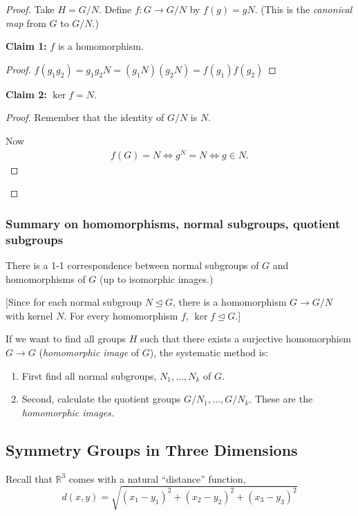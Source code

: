 \documentclass{article}
\theoremstyle{definition} \newtheorem*{definition}{Definition}
\newcommand{\reals}{\mathbb{R}} \newcommand{\rationals}{\mathbb{Q}}
\begin{document}
  \begin{proof} Take $H=G/N$. Define $f:G \rightarrow G/N$ by $f(g)=gN$. (This
    is the \textit{canonical map} from $G$ to $G/N$.)

    \textbf{Claim 1:} $f$ is a homomorphism.

    \begin{proof} $f(g_1g_2)=g_1g_2N=(g_1N)(g_2N)=f(g_1)f(g_2)$ \end{proof}

    \textbf{Claim 2:} $\ker f = N$.  \begin{proof} Remember that the identity of
      $G/N$ is $N$.
      
      Now 
      \begin{align*}
      f(G)=N \iff  g^N = N \iff g \in N. 
      \end{align*}
    \end{proof}
  \end{proof}

  \subsubsection*{Summary on homomorphisms, normal subgroups, quotient
  subgroups} There is a 1-1 correspondence between normal subgroups of $G$ and
  homomorphisms of $G$ (up to isomorphic images.)

  [Since for each normal subgroup $N \trianglelefteq G$, there is a
  homomorphism $G \rightarrow G/N$ with kernel $N$. For every homomorphism $f$,
$\ker f \trianglelefteq G$.]

  If we want to find all groups $H$ such that there exists a surjective
homomorphism $G \rightarrow G$ (\textit{homomorphic image} of $G$), the
systematic method is: \begin{enumerate} \item First find all normal subgroups,
      $N_1, \dots, N_k$ of $G$.  \item Second, calculate the quotient groups
        $G/N_1, \dots, G/N_k$. These are the \textit{homomorphic images.}
    \end{enumerate}

  \subsection{Symmetry Groups in Three Dimensions}

  Recall that $\reals^3$  comes with a natural ``distance'' function, \[
  d(x,y)=\sqrt{(x_1 - y_1)^2 + (x_2 - y_2)^2 + (x_3 - y_3)^2} \]
\end{document}
